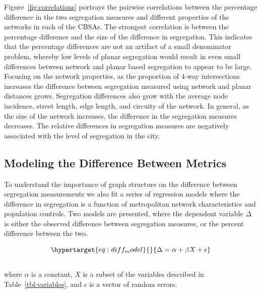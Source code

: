 \documentclass[
  10pt,
]{article}
\begin{document}
Figure~\ref{fig:correlations} portrays the pairwise correlations between
the percentage difference in the two segregation measures and different
properties of the networks in each of the CBSAs. The strongest
correlation is between the percentage difference and the size of the
difference in segregation. This indicates that the percentage
differences are not an artifact of a small denominator problem, whereby
low levels of planar segregation would result in even small differences
between network and planar based segregation to appear to be large.
Focusing on the network properties, as the proportion of 4-way
intersections increases the difference between segregation measured
using network and planar distances grows. Segregation differences also
grow with the average node incidence, street length, edge length, and
circuity of the network. In general, as the size of the network
increases, the difference in the segregation measures decreases. The
relative differences in segregation measures are negatively associated
with the level of segregation in the city.

\hypertarget{modeling-the-difference-between-metrics}{%
\subsection{Modeling the Difference Between
Metrics}\label{modeling-the-difference-between-metrics}}

To understand the importance of graph structure on the difference
between segregation measurements we also fit a series of regression
models where the difference in segregation is a function of metropolitan
network characteristics and population controls. Two models are
presented, where the dependent variable \(\Delta\) is either the
observed difference between segregation measures, or the percent
difference between the two.

\begin{equation}\protect\hypertarget{eq:diff_model}{}{
\Delta = \alpha + \beta X + \epsilon
}\label{eq:diff_model}\end{equation}\\
where \(\alpha\) is a constant, \(X\) is a subset of the variables
described in Table~\ref{tbl:variables}, and \(\epsilon\) is a vector of
random errors.
\end{document}
